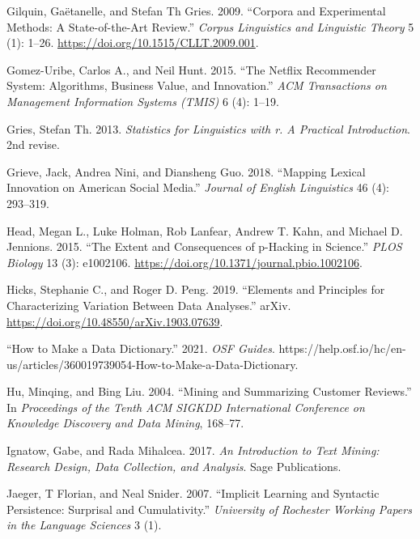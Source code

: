 \documentclass[
  letterpaper,
]{latex/krantz}
\newlength{\cslhangindent}
\newlength{\cslentryspacingunit} %
\newenvironment{CSLReferences}[2] %
 {%
  \setlength{\parindent}{0pt}
  \ifodd #1
  \let\oldpar\par
  \def\par{\hangindent=\cslhangindent\oldpar}
  \fi
  \setlength{\parskip}{#2\cslentryspacingunit}
 }%
 {}
\begin{document}
\begin{CSLReferences}{1}{0}
\leavevmode{}%
Gilquin, Gaëtanelle, and Stefan Th Gries. 2009. {``Corpora and
Experimental Methods: A State-of-the-Art Review.''} \emph{Corpus
Linguistics and Linguistic Theory} 5 (1): 1--26.
\url{https://doi.org/10.1515/CLLT.2009.001}.

\leavevmode{}%
Gomez-Uribe, Carlos A., and Neil Hunt. 2015. {``The Netflix Recommender
System: Algorithms, Business Value, and Innovation.''} \emph{ACM
Transactions on Management Information Systems (TMIS)} 6 (4): 1--19.

\leavevmode{}%
Gries, Stefan Th. 2013. \emph{Statistics for Linguistics with r. A
Practical Introduction}. 2nd revise.

\leavevmode{}%
Grieve, Jack, Andrea Nini, and Diansheng Guo. 2018. {``Mapping Lexical
Innovation on American Social Media.''} \emph{Journal of English
Linguistics} 46 (4): 293--319.

\leavevmode{}%
Head, Megan L., Luke Holman, Rob Lanfear, Andrew T. Kahn, and Michael D.
Jennions. 2015. {``The Extent and Consequences of p-Hacking in
Science.''} \emph{PLOS Biology} 13 (3): e1002106.
\url{https://doi.org/10.1371/journal.pbio.1002106}.

\leavevmode{}%
Hicks, Stephanie C., and Roger D. Peng. 2019. {``Elements and Principles
for Characterizing Variation Between Data Analyses.''} arXiv.
\url{https://doi.org/10.48550/arXiv.1903.07639}.

\leavevmode{}%
{``How to Make a Data Dictionary.''} 2021. \emph{OSF Guides}.
https://help.osf.io/hc/en-us/articles/360019739054-How-to-Make-a-Data-Dictionary.

\leavevmode{}%
Hu, Minqing, and Bing Liu. 2004. {``Mining and Summarizing Customer
Reviews.''} In \emph{Proceedings of the Tenth ACM SIGKDD International
Conference on Knowledge Discovery and Data Mining}, 168--77.

\leavevmode{}%
Ignatow, Gabe, and Rada Mihalcea. 2017. \emph{An Introduction to Text
Mining: Research Design, Data Collection, and Analysis}. Sage
Publications.

\leavevmode{}%
Jaeger, T Florian, and Neal Snider. 2007. {``Implicit Learning and
Syntactic Persistence: Surprisal and Cumulativity.''} \emph{University
of Rochester Working Papers in the Language Sciences} 3 (1).


\end{CSLReferences}
\end{document}
